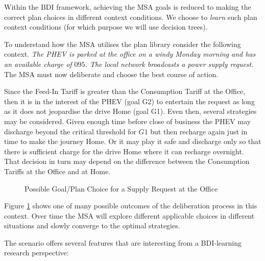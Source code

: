 \documentclass[a4paper]{article}
\begin{document}
Within the BDI framework, achieving the MSA goals is reduced to making the correct plan choices in different context conditions. We choose to \emph{learn} such plan context conditions (for which purpose we will use decision trees). 

To understand how the MSA utilises the plan library consider the following context. \emph{The PHEV is parked at the office on a windy Monday morning and has an available charge of $095$. The local network broadcasts a power supply request.} The MSA must now deliberate and choose the best course of action.

Since the Feed-In Tariff is greater than the Consumption Tariff at the Office, then it is in the interest of the PHEV (goal G2) to entertain the request as long as it does not jeopardise the drive Home (goal G1). Even then, several strategies may be considered. Given enough time before close of business the PHEV may discharge beyond the critical threshold for $G1$ but then recharge again just in time to make the journey Home. Or it may play it safe and discharge only so that there is sufficient charge for the drive Home where it can recharge overnight. That decision in turn may depend on the difference between the Consumption Tariffs at the Office and at Home. 

\begin{figure}[htbp]
\begin{center}
\fbox{

}
\end{center}
\caption{Possible Goal/Plan Choice for a Supply Request at the Office}
\label{fig:plan-choice}
\end{figure}

Figure \ref{fig:plan-choice} shows one of many possible outcomes of the deliberation process in this context. Over time the MSA will explore different applicable choices in different situations and slowly converge to the optimal strategies.

The scenario offers several features that are interesting from a BDI-learning research perspective:
\end{document}
